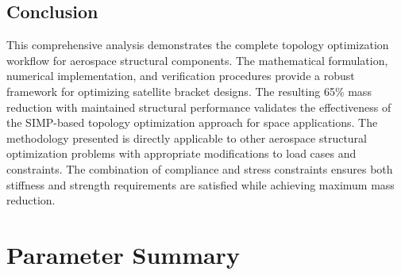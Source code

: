 \documentclass[11pt]{report}
\begin{document}
\section{Conclusion}
This comprehensive analysis demonstrates the complete topology optimization workflow for aerospace structural components. The mathematical formulation, numerical implementation, and verification procedures provide a robust framework for optimizing satellite bracket designs. The resulting 65\% mass reduction with maintained structural performance validates the effectiveness of the SIMP-based topology optimization approach for space applications. The methodology presented is directly applicable to other aerospace structural optimization problems with appropriate modifications to load cases and constraints. The combination of compliance and stress constraints ensures both stiffness and strength requirements are satisfied while achieving maximum mass reduction.

\appendix
\chapter{Parameter Summary}
\end{document}
